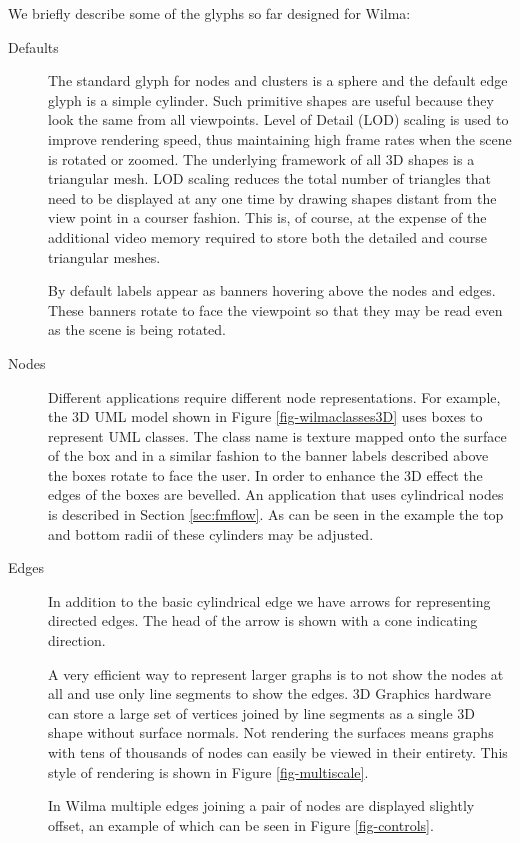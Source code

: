 \documentclass[runningheads]{cl2emult}
\begin{document}
We briefly describe some of the glyphs so far designed for Wilma:
\begin{description}
\item[Defaults]  The standard glyph for nodes and clusters is a sphere
and the default
edge glyph is a simple cylinder.  Such primitive shapes are useful
because they look the same from all viewpoints.  Level of Detail (LOD)
scaling is used to improve rendering speed, thus maintaining high
frame rates when the scene is rotated or zoomed.  The underlying
framework of all 3D shapes is a triangular mesh.  LOD scaling reduces
the total number of triangles that need to be displayed at any one
time by drawing shapes distant from the view point in a courser fashion.
This is, of course, at the expense of the additional video memory
required to store both the detailed and course triangular meshes.

By default labels appear as banners hovering above the nodes and edges.  These
banners rotate to face the viewpoint so that
they may be read even as the scene is being rotated. 
\item[Nodes]  Different applications require different node
representations.  For example, the 3D UML model shown in Figure
\ref{fig-wilmaclasses3D} uses boxes to represent UML classes.  The
class name is texture mapped onto the surface of the box and in a
similar fashion to the banner labels described above the boxes rotate
to face the user.  In order to enhance the 3D effect the edges of the
boxes are bevelled.  An application that uses cylindrical nodes is
described in Section \ref{sec:fmflow}.  As can be seen in the example
the top and bottom radii of
these cylinders may be adjusted.
\item[Edges] In addition to the basic cylindrical edge we have arrows
for representing directed edges.  The head of the arrow is shown with a cone
indicating direction.

A very efficient way to represent larger graphs is to not show the
nodes at all and use only line segments to show the edges.  3D Graphics
hardware can store a large set of vertices joined by line segments as
a single 3D shape without surface normals.  Not rendering the
surfaces means graphs with tens of thousands of nodes can easily be viewed in
their entirety.  This style of rendering is shown in Figure
\ref{fig-multiscale}.

In Wilma multiple edges joining a pair of nodes are displayed slightly
offset, an example of which can be seen in Figure \ref{fig-controls}.


\end{description}
\end{document}
